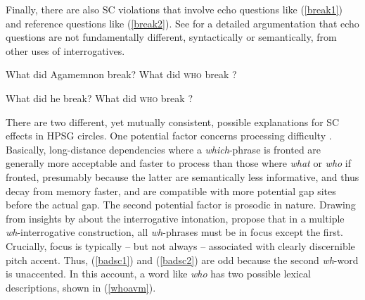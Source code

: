 \documentclass[output=paper,biblatex,babelshorthands,newtxmath,draftmode,colorlinks,citecolor=brown]{langscibook}
\begin{document}
\noindent 
Finally, there are also SC violations that involve echo questions like (\ref{break1}) and reference
questions like (\ref{break2}). See \citet[Chapter 7]{ginzsag} for a detailed argumentation that echo
questions are not fundamentally different, syntactically or semantically, from other uses of
interrogatives.

\eal \label{break1}
\ex What did Agamemnon break?
\ex What did \textsc{who} break \spc?
\zl

\eal  \label{break2}
\ex What did he break?
\ex What did \textsc{who} break \spc?
\zl

There are two different, yet mutually consistent, possible explanations for SC effects in HPSG
circles.  One potential factor concerns processing difficulty \citep{arnon07}. Basically,
long-distance dependencies where a \emph{which}-phrase is fronted are generally more acceptable and
faster to process than those where \emph{what} or \emph{who} if fronted, presumably because the
latter are semantically less informative, and thus decay from memory faster, and are compatible with
more potential gap sites before the actual gap.  The second potential factor is prosodic in
nature. Drawing from insights by \citet[170--172]{Ladd96} about the  interrogative
intonation, \citet[251]{ginzsag} propose that in a multiple \emph{wh}-interrogative construction,
all \emph{wh}-phrases must be in focus except the first. Crucially, focus is typically -- but not
always -- associated with clearly discernible pitch accent. Thus, (\ref{badsc1}) and (\ref{badsc2})
are odd because the second \emph{wh}-word is unaccented. In this account, a word like \emph{who}
has two possible lexical descriptions, shown in (\ref{whoavm}).


\eal \label{whoavm}
\end{document}
